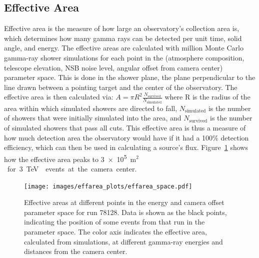 \subsection{Effective Area}\label{subsec:effarea}
Effective area is the measure of how large an observatory's collection area is, which determines how many gamma rays can be detected per unit time, solid angle, and energy.
The effective areas are calculated with  million Monte Carlo gamma-ray shower simulations for each point in the (atmosphere composition, telescope elevation, NSB noise level, angular offset from camera center) parameter space.
This is done in the shower plane, the plane perpendicular to the line drawn between a pointing target and the center of the observatory.
The effective area is then calculated via:
$A=\pi R^2 \frac{N_{\text{survived}}}{N_{\text{simulated}}}$
where R is the radius of the area within which simulated showers are directed to fall, $N_{\text{simulated}}$ is the number of showers that were initially simulated into the area, and $N_{\text{survived}}$ is the number of simulated showers that pass all cuts.
This effective area is thus a measure of how much detection area the observatory would have if it had a 100\% detection efficiency, which can then be used in calculating a source's flux.
Figure~\ref{fig:effarea_paramspace} shows how the effective area peaks to \nicetilde{}\SI{3e5}{m${}^2$} for \SI{3}{\TeV{}} events at the camera center.

\begin{figure}[!t]
  \centering
  \texttt{[image: images/effarea\_plots/effarea\_space.pdf]}
  \caption[Effective Area Parameter Space]{
    Effective areas at different points in the energy and camera offset parameter space for run 78128.
    Data is shown as the black points, indicating the position of some events from that run in the parameter space.
    The color axis indicates the effective area, calculated from simulations, at different gamma-ray energies and distances from the camera center.
  }
  \label{fig:effarea_paramspace}
\end{figure}

